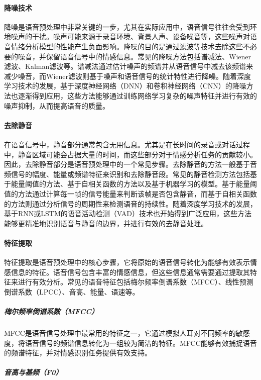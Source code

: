 \paragraph{降噪技术}

降噪是语音预处理中非常关键的一步，尤其在实际应用中，语音信号往往会受到环境噪声的干扰。噪声可能来源于录音环境、背景人声、设备噪音等，这些噪声对语音情绪分析模型的性能产生负面影响。降噪的目的是通过滤波等技术去除这些不必要的噪音，并保留语音信号中的情感信息。常见的降噪方法包括谱减法、Wiener滤波、Kalman滤波等。谱减法通过估计噪声的频谱并从语音信号中减去该频谱来减少噪音，而Wiener滤波则基于噪声和语音信号的统计特性进行降噪。随着深度学习技术的发展，基于深度神经网络（DNN）和卷积神经网络（CNN）的降噪方法也逐渐得到应用，这些方法能够通过训练网络学习复杂的噪声特征并进行有效的噪声抑制，从而提高语音的质量。

\paragraph{去除静音}

在语音信号中，静音部分通常包含无用信息。尤其是在长时间的录音或对话过程中，静音区域可能会占据大量的时间，而这些部分对于情感分析任务的贡献较小。因此，去除静音部分是语音预处理中的一个常见步骤。去除静音的方法一般基于音频信号的幅度、能量或频谱特征来识别和去除静音段。常见的静音检测方法包括基于能量阈值的方法、基于自相关函数的方法以及基于机器学习的模型。基于能量阈值的方法通过计算每一帧的信号能量来判断该帧是否包含静音，而基于自相关函数的方法则通过分析信号的周期性来检测语音的持续性。随着深度学习技术的发展，基于RNN或LSTM的语音活动检测（VAD）技术也开始得到广泛应用，这些方法能够更精准地识别语音与静音的边界，并进行有效的去静音处理。

\paragraph{特征提取}

特征提取是语音预处理中的核心步骤，它将原始的语音信号转化为能够有效表示情感信息的特征。语音信号包含丰富的情感信息，但这些信息通常需要通过提取其特征来进行有效分析。常见的语音特征包括梅尔频率倒谱系数（MFCC）、线性预测倒谱系数（LPCC）、音高、能量、语速等。

\subparagraph{梅尔频率倒谱系数（MFCC）}

MFCC是语音信号处理中最常用的特征之一，它通过模拟人耳对不同频率的敏感度，将语音信号的频谱信息转化为一组较为简洁的特征。MFCC能够有效捕捉语音的频谱特征，并对情感识别任务提供有效支持。

\subparagraph{音高与基频（F0）}

